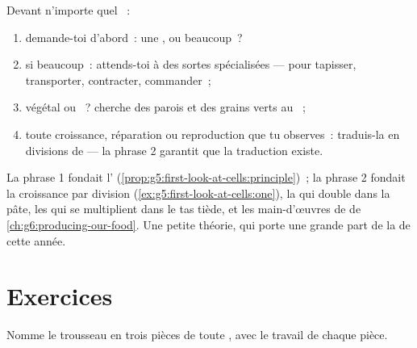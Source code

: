 \begin{method}\label{met:g6:cell-unit-of-life:read}
Devant n'importe quel ~:
\begin{enumerate}
  \item demande-toi d'abord~: une , ou beaucoup~?
  \item si beaucoup~: attends-toi à des sortes spécialisées ---
        pour tapisser, transporter, contracter, commander~;
  \item végétal ou ~? cherche des parois et des grains verts
        au ~;
  \item toute croissance, réparation ou reproduction que tu
        observes~: traduis-la en divisions de  --- la
        phrase 2 garantit que la traduction existe.
\end{enumerate}
\end{method}

\begin{example}\label{ex:g6:cell-unit-of-life:atwork}
La phrase 1 fondait l'
(\cref{prop:g5:first-look-at-cells:principle})~; la phrase 2 fondait
la croissance par division
(\cref{ex:g5:first-look-at-cells:one}), la  qui double dans la
pâte, les  qui se multiplient dans le tas tiède, et les
main-d'œuvres de  de
\cref{ch:g6:producing-our-food}. Une petite théorie, qui porte une
grande part de la  de cette année.
\end{example}

\section{Exercices}

\begin{exercise}[$\star$]\label{exo:g6:cell-unit-of-life:1}
Nomme le trousseau en trois pièces de toute , avec le travail
de chaque pièce.
\end{exercise}

